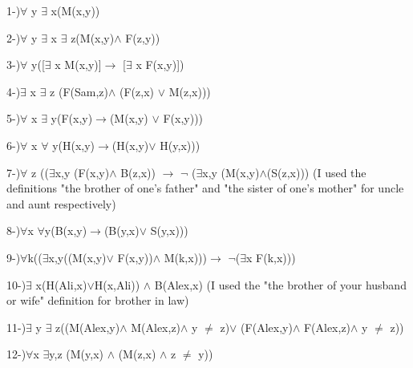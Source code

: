 \documentclass[a4paper,12pt]{article}
\begin{document}
\begin{tcolorbox}
1-)$\forall$ y $\exists$ x(M(x,y))

2-)$\forall$ y $\exists$ x $\exists$ z(M(x,y)$\land$ F(z,y))

3-)$\forall$ y([$\exists$ x M(x,y)]$\rightarrow$ [$\exists$ x F(x,y)])

4-)$\exists$ x $\exists$ z (F(Sam,z)$\land$ (F(z,x) $\lor$ M(z,x)))

5-)$\forall$ x $\exists$ y(F(x,y)$\rightarrow$(M(x,y) $\lor$ F(x,y)))

6-)$\forall$ x $\forall$ y(H(x,y)$\rightarrow$(H(x,y)$\lor$ H(y,x)))

7-)$\forall$ z (($\exists$x,y (F(x,y)$\land$ B(z,x)) $\rightarrow$ $\lnot$ ($\exists$x,y (M(x,y)$\land$(S(z,x))) (I used the definitions "the brother of one's father" and "the sister of one's mother" for uncle and aunt respectively)

8-)$\forall$x  $\forall$y(B(x,y)$\rightarrow$(B(y,x)$\lor$ S(y,x)))

9-)$\forall$k(($\exists$x,y((M(x,y)$\lor$ F(x,y))$\land$ M(k,x)))$\rightarrow$ $\lnot$($\exists$x F(k,x)))

10-)$\exists$ x(H(Ali,x)$\lor$H(x,Ali)) $\land$ B(Alex,x) (I used the "the brother of your husband or wife" definition for brother in law)

11-)$\exists$ y $\exists$ z((M(Alex,y)$\land$ M(Alex,z)$\land$ y $\neq$ z)$\lor$ (F(Alex,y)$\land$ F(Alex,z)$\land$ y $\neq$ z))

12-)$\forall$x $\exists$y,z (M(y,x) $\land$ (M(z,x) $\land$ z $\neq$ y))

\end{tcolorbox}


\newpage
\end{document}
